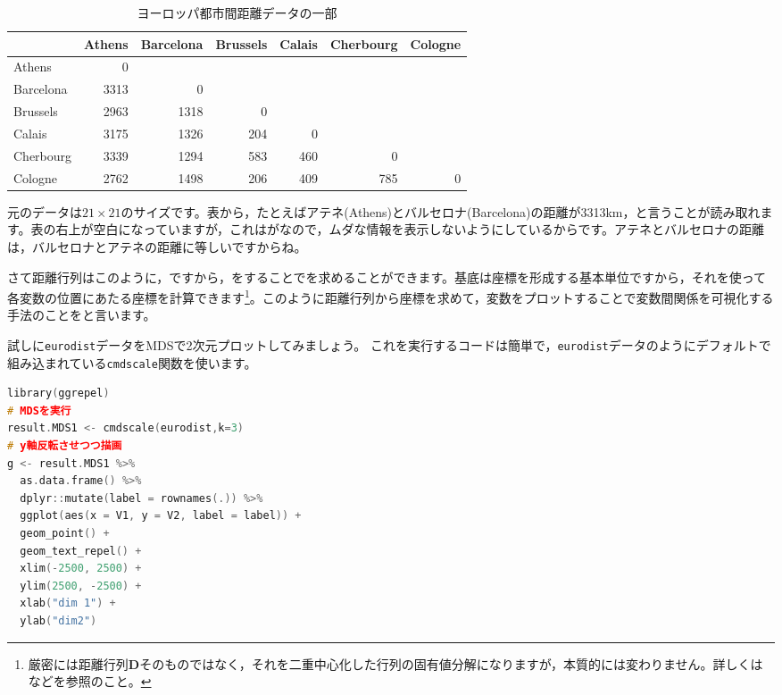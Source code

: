 \documentclass{ltjsbook}
\begin{document}
\begin{table}[ht]
    \centering
    \caption{ヨーロッパ都市間距離データの一部}
    \begin{tabular}{l|rrrrrr}
                  & Athens & Barcelona & Brussels & Calais & Cherbourg & Cologne \\
        \hline
        Athens    & 0      &           &          &        &           &         \\
        Barcelona & 3313   & 0         &          &        &           &         \\
        Brussels  & 2963   & 1318      & 0        &        &           &         \\
        Calais    & 3175   & 1326      & 204      & 0      &           &         \\
        Cherbourg & 3339   & 1294      & 583      & 460    & 0         &         \\
        Cologne   & 2762   & 1498      & 206      & 409    & 785       & 0       \\
        \hline
    \end{tabular}
    \label{tbl::15_01}
\end{table}

元のデータは$21 \times 21$のサイズです。表から，たとえばアテネ(Athens)とバルセロナ(Barcelona)の距離が3313km，と言うことが読み取れます。表の右上が空白になっていますが，これはがなので，ムダな情報を表示しないようにしているからです。アテネとバルセロナの距離は，バルセロナとアテネの距離に等しいですからね。

さて距離行列はこのように，ですから，をすることでを求めることができます。基底は座標を形成する基本単位ですから，それを使って各変数の位置にあたる座標を計算できます\footnote{厳密には距離行列$\bm{D}$そのものではなく，それを二重中心化した行列の固有値分解になりますが，本質的には変わりません。詳しくは\citet{Okada19940115}などを参照のこと。}。このように距離行列から座標を求めて，変数をプロットすることで変数間関係を可視化する手法のことをと言います。

試しに\texttt{eurodist}データをMDSで2次元プロットしてみましょう。
これを実行するコードは簡単で，\texttt{eurodist}データのようにデフォルトで組み込まれている\texttt{cmdscale}関数を使います。

\begin{lstlisting}[language=C++,label={code:x15_01},caption={計量MDSの実践と描画}]
library(ggrepel)
# MDSを実行
result.MDS1 <- cmdscale(eurodist,k=3)
# y軸反転させつつ描画
g <- result.MDS1 %>%
  as.data.frame() %>%
  dplyr::mutate(label = rownames(.)) %>%
  ggplot(aes(x = V1, y = V2, label = label)) +
  geom_point() +
  geom_text_repel() +
  xlim(-2500, 2500) +
  ylim(2500, -2500) +
  xlab("dim 1") +
  ylab("dim2")
\end{lstlisting}
\end{document}
